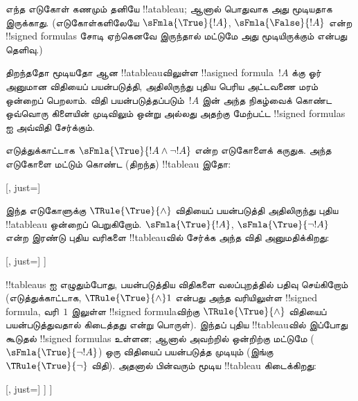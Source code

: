 \documentclass[../../../include/open-logic-section]{subfiles}
\begin{document}
\begin{ex}
  எந்த எடுகோள் கணமும் தனியே !!a{tableau}; ஆனால் பொதுவாக அது மூடியதாக
  இருக்காது. (எடுகோள்களிலேயே $\sFmla{\True}{!A}$,
  $\sFmla{\False}{!A}$ என்ற !!{signed formula}s சோடி ஏற்கெனவே இருந்தால்
  மட்டுமே அது மூடியிருக்கும் என்பது தெளிவு.)

  திறந்ததோ மூடியதோ ஆன !!a{tableau}விலுள்ள !!a{signed formula}~$!A$ க்கு
  ஓர் அனுமான விதியைப் பயன்படுத்தி, அதிலிருந்து புதிய பெரிய அட்டவணை மரம் ஒன்றைப்
  பெறலாம். விதி பயன்படுத்தப்படும்~$!A$ இன் அந்த நிகழ்வைக் கொண்ட ஒவ்வொரு
  கிளையின் முடிவிலும் ஒன்று அல்லது அதற்கு மேற்பட்ட !!{signed formula}s ஐ
  அவ்விதி சேர்க்கும்.

  எடுத்துக்காட்டாக $\sFmla{\True}{!A \land \lnot !A}$ என்ற எடுகோளைக்
  கருதுக. அந்த எடுகோளை மட்டும் கொண்ட (திறந்த) !!{tableau} இதோ:
  \begin{center}
    \begin{tableau}{}
      [, just=\TAss]
    \end{tableau}{}
  \end{center}
  இந்த எடுகோளுக்கு $\TRule{\True}{\land}$ விதியைப் பயன்படுத்தி அதிலிருந்து
  புதிய !!a{tableau} ஒன்றைப் பெறுகிறோம். $\sFmla{\True}{!A}$,
  $\sFmla{\True}{\lnot !A}$ என்ற இரண்டு புதிய வரிகளை !!{tableau}வில் சேர்க்க
  அந்த விதி அனுமதிக்கிறது:
  \begin{center}
    \begin{tableau}{}
      [, just=\TAss
        [\sFmla{\True}{\formula{A}}, just={\TRule{\True}{\land}[1]},
          [\sFmla{\True}{\lnot \formula{A}}, just={\TRule{\True}{\land}[1]}
          ]
        ]
      ]
    \end{tableau}{}
  \end{center}
  !!{tableau}s ஐ எழுதும்போது, பயன்படுத்திய விதிகளை வலப்புறத்தில் பதிவு
  செய்கிறோம் (எடுத்துக்காட்டாக, $\TRule{\True}{\land} 1$ என்பது அந்த வரியிலுள்ள
  !!{signed formula}, வரி~$1$ இலுள்ள !!{signed formula}விற்கு
  $\TRule{\True}{\land}$ விதியைப் பயன்படுத்துவதால் கிடைத்தது என்று பொருள்).
  இந்தப் புதிய !!{tableau}வில் இப்போது கூடுதல் !!{signed formula}s உள்ளன;
  ஆனால் அவற்றில் ஒன்றிற்கு மட்டுமே ($\sFmla{\True}{\lnot !A}$) ஒரு விதியைப்
  பயன்படுத்த முடியும் (இங்கு $\TRule{\True}{\lnot}$ விதி). அதனால் பின்வரும்
  மூடிய !!{tableau} கிடைக்கிறது:
  \begin{center}
    \begin{tableau}{}
      [, just=\TAss
        [\sFmla{\True}{\formula{A}}, just={\TRule{\True}{\land}[1]}
          [\sFmla{\True}{\lnot \formula{A}}, just={\TRule{\True}{\land}[1]}
            [\sFmla{\False}{\formula{A}}, just={\TRule{\True}{\lnot}[3]}, close]
          ]
        ]
      ]
    \end{tableau}{}
  \end{center}
\end{ex}
\end{document}
